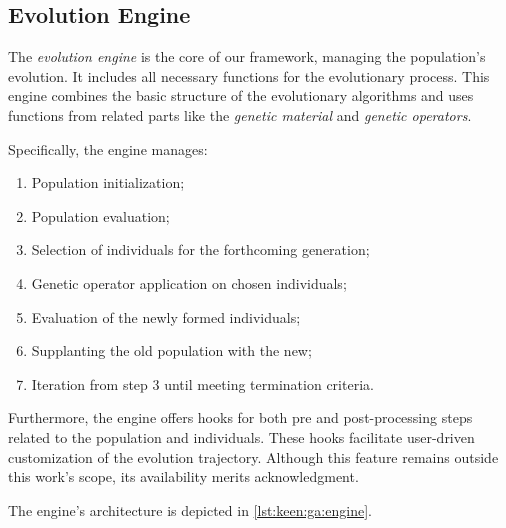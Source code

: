 \subsection{Evolution Engine}
\label{sec:keen:ga:engine}

    The \emph{evolution engine} is the core of our framework, managing the population's evolution. It includes all necessary functions for the evolutionary process. This engine combines the basic structure of the evolutionary algorithms and uses functions from related parts like the \emph{genetic material} and \emph{genetic operators}.

    Specifically, the engine manages:

    \begin{enumerate}
        \item Population initialization;
        \item Population evaluation;
        \item Selection of individuals for the forthcoming generation;
        \item Genetic operator application on chosen individuals;
        \item Evaluation of the newly formed individuals;
        \item Supplanting the old population with the new;
        \item Iteration from step 3 until meeting termination criteria.
    \end{enumerate}

    Furthermore, the engine offers hooks for both pre and post-processing steps
    related to the population and individuals.
    These hooks facilitate user-driven customization of the evolution trajectory.
    Although this feature remains outside this work's scope, its availability merits
    acknowledgment.

    The engine's architecture is depicted in \vref{lst:keen:ga:engine}.

